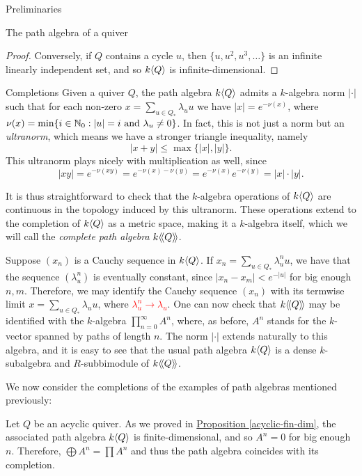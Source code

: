 \begin{chapter}{Preliminaries}
\begin{section}{The path algebra of a quiver}
\begin{proof}
Conversely, if $Q$ contains a cycle $u$, then $\{u,u^2,u^3,\dots\}$ is an infinite linearly independent set, and so $k\langle Q\rangle$ is infinite-dimensional.
\end{proof}
\end{section}

\begin{section}{Completions}
Given a quiver $Q$, the path algebra $k\langle Q\rangle$ admits a $k$-algebra norm $\vert \cdot \vert$ such that for each non-zero $x=\sum_{u\in Q_*} \lambda_u u$ we have $\vert x\vert = e^{-\nu(x)}$, where $\nu(x) = \min\{ i\in \mathbb{N}_0 : |u| = i \text{ and } \lambda_u \neq 0 \}$. In fact, this is not just a norm but an \emph{ultranorm}, which means we have a stronger triangle inequality, namely \[|x+y|\leq \max\{|x|,|y|\}.\] This ultranorm plays nicely with multiplication as well, since \[|xy|=e^{-\nu(xy)}=e^{-\nu(x)-\nu(y)} = e^{-\nu(x)}e^{-\nu(y)}=|x|\cdot|y|.\]

It is thus straightforward to check that the $k$-algebra operations of $k\langle Q\rangle$ are continuous in the topology induced by this ultranorm. These operations extend to the completion of $k\langle Q\rangle$ as a metric space, making it a $k$-algebra itself, which we will call the \emph{complete path algebra} $k\langle\!\langle Q\rangle\!\rangle$.

Suppose $(x_n)$ is a Cauchy sequence in $k\langle Q\rangle$. If $x_n=\sum_{u\in Q_*} \lambda_u^n u$, we have that the sequence $(\lambda_u^n)$ is eventually constant, since $|x_n-x_m|<e^{-|u|}$ for big enough $n,m$. Therefore, we may identify the Cauchy sequence $(x_n)$ with its termwise limit $x=\sum_{u\in Q_*} \lambda_u u$, where \textcolor{red}{$\lambda_u^n \to \lambda_u$}. One can now check that $k\langle\!\langle Q\rangle\!\rangle$ may be identified with the $k$-algebra $\prod_{n=0}^\infty A^n$, where, as before, $A^n$ stands for the $k$-vector spanned by paths of length $n$. The norm $|\cdot|$ extends naturally to this algebra, and it is easy to see that the usual path algebra $k\langle Q\rangle$ is a dense $k$-subalgebra and $R$-subbimodule of $k\langle\!\langle Q\rangle\!\rangle$.

We now consider the completions of the examples of path algebras mentioned previously:

\begin{exmp}Let $Q$ be an acyclic quiver. As we proved in \hyperref[acyclic-fin-dim]{Proposition \ref*{acyclic-fin-dim}}, the associated path algebra $k\langle Q\rangle$ is finite-dimensional, and so $A^n=0$ for big enough $n$. Therefore, $\bigoplus A^n=\prod A^n$ and thus the path algebra coincides with its completion.
\end{exmp}


\end{section}
\end{chapter}
